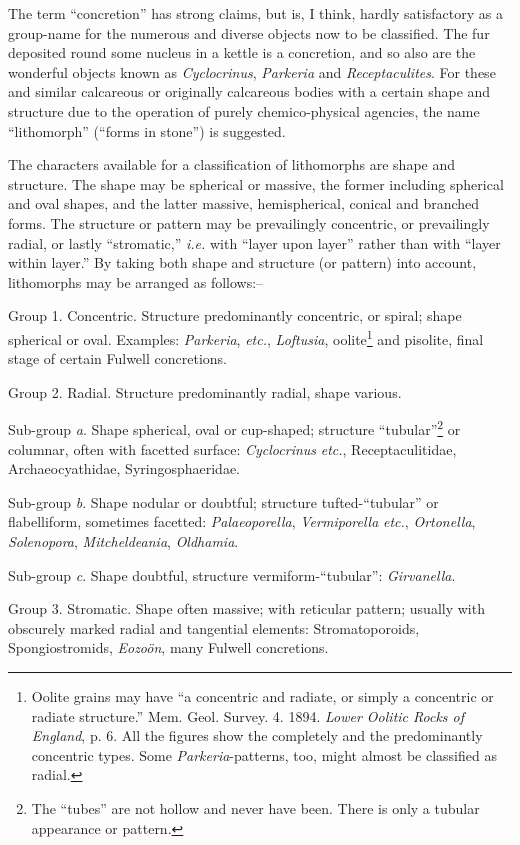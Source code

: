 \documentclass[a4paper, 12pt, oneside, landscape]{article}
\begin{document}
The term ``concretion'' has strong claims, but is, I think, hardly satisfactory as a group-name for the numerous and diverse objects now to be classified. The fur deposited round some nucleus in a kettle is a concretion, and so also are the wonderful objects known as \emph{Cyclocrinus}, \emph{Parkeria} and \emph{Receptaculites}. For these and similar calcareous or originally calcareous bodies with a certain shape and structure due to the operation of purely chemico-physical agencies, the name ``lithomorph'' (``forms in stone'') is suggested.

The characters available for a classification of lithomorphs are shape and structure. The shape may be spherical or massive, the former including spherical and oval shapes, and the latter massive, hemispherical, conical and branched forms. The structure or pattern may be prevailingly concentric, or prevailingly radial, or lastly ``stromatic,'' \emph{i.e.} with ``layer upon layer'' rather than with ``layer within layer.'' By taking both shape and structure (or pattern) into account, lithomorphs may be arranged as follows:--
\begin{description}
    \item Group 1. Concentric. Structure predominantly concentric, or spiral; shape spherical or oval. Examples: \emph{Parkeria}, \emph{etc.}, \emph{Loftusia}, oolite\footnote{Oolite grains may have ``a concentric and radiate, or simply a concentric or radiate structure.'' Mem. Geol. Survey. 4. 1894. \emph{Lower Oolitic Rocks of England}, p. 6. All the figures show the completely and the predominantly concentric types. Some \emph{Parkeria}-patterns, too, might almost be classified as radial.} and pisolite, final stage of certain Fulwell concretions.

    \item Group 2. Radial. Structure predominantly radial, shape various.

Sub-group \emph{a}. Shape spherical, oval or cup-shaped; structure ``tubular''\footnote{The ``tubes'' are not hollow and never have been. There is only a tubular appearance or pattern.} or columnar, often with facetted surface: \emph{Cyclocrinus} \emph{etc.}, Receptaculitidae, Archaeocyathidae, Syringosphaeridae.

Sub-group \emph{b}. Shape nodular or doubtful; structure tufted-``tubular'' or flabelliform, sometimes facetted: \emph{Palaeoporella}, \emph{Vermiporella} \emph{etc.}, \emph{Ortonella}, \emph{Solenopora}, \emph{Mitcheldeania}, \emph{Oldhamia}.

Sub-group \emph{c}. Shape doubtful, structure vermiform-``tubular'': \emph{Girvanella}.

    \item Group 3. Stromatic. Shape often massive; with reticular pattern; usually with obscurely marked radial and tangential elements: Stromatoporoids, Spongiostromids, \emph{Eozoön}, many Fulwell concretions.
\end{description}
\end{document}
